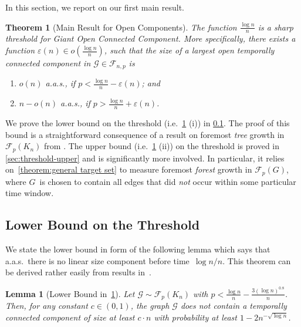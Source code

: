 \documentclass[a4paper,11pt]{article}
\makeatletter
\theoremstyle{definition}
\theoremstyle{plain}
\newtheorem{theorem}{Theorem}
\newtheorem{lemma}{Lemma}
\newcommand{\FFF}{\mathcal{F}}
\newcommand{\GGG}{\mathcal{G}}
\newcommand{\G}{\mathcal G}
\newcommand{\F}{\mathcal F}
\newcommand{\aas}{a.a.s.\@\xspace}
\makeatother
\begin{document}
In this section, we report on our first main result.

\begin{theorem}[Main Result for Open Components]\label{th:main}
	The function $\frac{\log n}{n}$ is a sharp threshold for Giant Open Connected Component. More specifically, there exists a function $\varepsilon(n) \in o\mathopen{}\left(\frac{\log n}{n}\right)$, such that the size of a largest open temporally connected component in $\G \in \F_{n,p}$ is
	\begin{enumerate}
			\item[(i)] $o(n)$ \aas, if $p<\frac{\log n}{n} - \varepsilon(n)$; and
			\item[(ii)] $n-o(n)$ \aas, if $p>\frac{\log n}{n} + \varepsilon(n)$.
	\end{enumerate}
\end{theorem}

We prove the lower bound on the threshold (i.e.~\cref{th:main} (i)) in \cref{sec:threshold-lower}.
The proof of this bound is a straightforward consequence of a result on foremost \emph{tree} growth in $\F_p(K_n)$ from \cite{CasteigtsRRZ21}.
%
The upper bound (i.e.~\cref{th:main} (ii)) on the threshold is proved in \cref{sec:threshold-upper}
and is significantly more involved.
In particular, it relies on~\cref{theorem:general target set} to measure foremost \emph{forest} growth in $\F_p(G)$, where $G$~is chosen to contain all edges that did \emph{not} occur within some particular time window.


\subsection{Lower Bound on the Threshold}
\label{sec:threshold-lower}
We state the lower bound in form of the following lemma which says that a.a.s.\ there is no linear size component before time~$\log n / n$.
This theorem can be derived rather easily from results in~\cite{CasteigtsRRZ21}.
\begin{lemma}[Lower Bound in~\cref{th:main}]\label{thm: lower bound}
    Let $\GGG \sim \FFF_{p}(K_n)$ with $p<\frac{\log n}{n} - \frac{3 (\log n)^{0.8}}{n}$. Then, for any constant $c\in (0,1)$, the graph $\GGG$ does not contain a temporally connected component of size at least $c\cdot n$ with probability at least $1-2n^{-\sqrt{\log n}}$.
\end{lemma}
\end{document}
